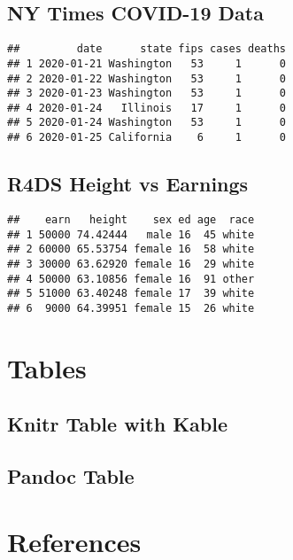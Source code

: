 \documentclass[
]{article}
\begin{document}
\hypertarget{ny-times-covid-19-data}{%
\subsection{NY Times COVID-19 Data}\label{ny-times-covid-19-data}}

\begin{verbatim}
##         date      state fips cases deaths
## 1 2020-01-21 Washington   53     1      0
## 2 2020-01-22 Washington   53     1      0
## 3 2020-01-23 Washington   53     1      0
## 4 2020-01-24   Illinois   17     1      0
## 5 2020-01-24 Washington   53     1      0
## 6 2020-01-25 California    6     1      0
\end{verbatim}

\hypertarget{r4ds-height-vs-earnings}{%
\subsection{R4DS Height vs Earnings}\label{r4ds-height-vs-earnings}}

\begin{verbatim}
##    earn   height    sex ed age  race
## 1 50000 74.42444   male 16  45 white
## 2 60000 65.53754 female 16  58 white
## 3 30000 63.62920 female 16  29 white
## 4 50000 63.10856 female 16  91 other
## 5 51000 63.40248 female 17  39 white
## 6  9000 64.39951 female 15  26 white
\end{verbatim}

\hypertarget{tables}{%
\section{Tables}\label{tables}}

\hypertarget{knitr-table-with-kable}{%
\subsection{Knitr Table with Kable}\label{knitr-table-with-kable}}

\hypertarget{pandoc-table}{%
\subsection{Pandoc Table}\label{pandoc-table}}

\hypertarget{references}{%
\section{References}\label{references}}
\end{document}
